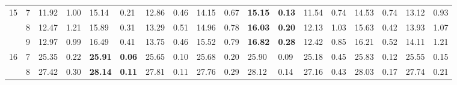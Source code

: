 \documentclass[conference]{IEEEtran}
\begin{document}
\begin{table}[t]
\begin{tabular}{|cc|ll|ll|ll|ll|ll|ll|ll|ll|}
		\multicolumn{1}{|c|}{\multirow{3}{*}{15}} & 7          & \multicolumn{1}{l|}{11.92}         & 1.00                              & \multicolumn{1}{l|}{15.14}          & 0.21                              & \multicolumn{1}{l|}{12.86}         & 0.46                              & \multicolumn{1}{l|}{14.15}         & 0.67                              & \multicolumn{1}{l|}{\textbf{15.15}}       & \textbf{0.13} & \multicolumn{1}{l|}{11.54} & 0.74 & \multicolumn{1}{l|}{14.53}          & 0.74          & \multicolumn{1}{l|}{13.12} & 0.93 \\ \cline{2-18} 
		\multicolumn{1}{|c|}{}                    & 8          & \multicolumn{1}{l|}{12.47}         & 1.21                              & \multicolumn{1}{l|}{15.89}          & 0.31                              & \multicolumn{1}{l|}{13.29}         & 0.51                              & \multicolumn{1}{l|}{14.96}         & 0.78                              & \multicolumn{1}{l|}{\textbf{16.03}}       & \textbf{0.20} & \multicolumn{1}{l|}{12.13} & 1.03 & \multicolumn{1}{l|}{15.63}          & 0.42          & \multicolumn{1}{l|}{13.93} & 1.07 \\ \cline{2-18} 
		\multicolumn{1}{|c|}{}                    & 9          & \multicolumn{1}{l|}{12.97}         & 0.99                              & \multicolumn{1}{l|}{16.49}          & 0.41                              & \multicolumn{1}{l|}{13.75}         & 0.46                              & \multicolumn{1}{l|}{15.52}         & 0.79                              & \multicolumn{1}{l|}{\textbf{16.82}}       & \textbf{0.28} & \multicolumn{1}{l|}{12.42} & 0.85 & \multicolumn{1}{l|}{16.21}          & 0.52          & \multicolumn{1}{l|}{14.11} & 1.21 \\ \hline
		\multicolumn{1}{|c|}{\multirow{3}{*}{16}} & 7          & \multicolumn{1}{l|}{25.35}         & 0.22                              & \multicolumn{1}{l|}{\textbf{25.91}} & \textbf{0.06}                     & \multicolumn{1}{l|}{25.65}         & 0.10                              & \multicolumn{1}{l|}{25.68}         & 0.20                              & \multicolumn{1}{l|}{25.90}                & 0.09          & \multicolumn{1}{l|}{25.18} & 0.45 & \multicolumn{1}{l|}{25.83}          & 0.12          & \multicolumn{1}{l|}{25.55} & 0.15 \\ \cline{2-18} 
		\multicolumn{1}{|c|}{}                    & 8          & \multicolumn{1}{l|}{27.42}         & 0.30                              & \multicolumn{1}{l|}{\textbf{28.14}} & \textbf{0.11}                     & \multicolumn{1}{l|}{27.81}         & 0.11                              & \multicolumn{1}{l|}{27.76}         & 0.29                              & \multicolumn{1}{l|}{28.12}                & 0.14          & \multicolumn{1}{l|}{27.16} & 0.43 & \multicolumn{1}{l|}{28.03}          & 0.17          & \multicolumn{1}{l|}{27.74} & 0.21 \\ \cline{2-18} 

\end{tabular}
\end{table}
\end{document}
